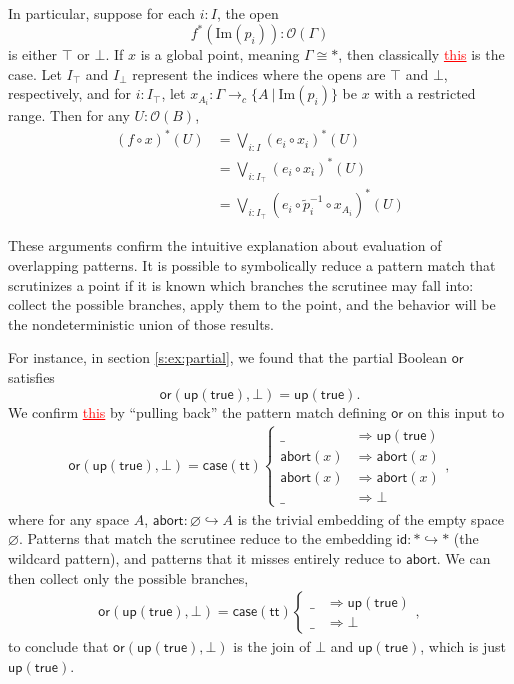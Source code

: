 \documentclass[conference]{IEEEtran}
\newcommand{\hookto}{\hookrightarrow}
\newcommand{\cto}{\to_c}
\newcommand{\suchthat}{\ |\ }
\newcommand{\Zero}{\varnothing}
\newcommand{\One}{\ast}
\newcommand{\Open}[1]{\mathcal{O}({#1})}
\newcommand{\wildcard}{\_}
\newcommand{\Img}[1]{\text{Im}\left({#1}\right)}
\newcommand{\Branch}{\Rightarrow}
\newcommand{\up}{\mathsf{up}}
\newcommand{\btrue}{\mathsf{true}}
\newcommand{\iimg}[1]{#1^*}
\newcommand{\grammar}[1]{\textcolor{red}{\underline{#1}}}
\begin{document}
In particular, suppose for each $i : I$, the open
\[
f^*(\Img{p_i}) : \Open{\Gamma}
\]
is either $\top$ or $\bot$. If $x$ is a global point, meaning $\Gamma \cong \One$, then classically \grammar{this} is the case. Let $I_\top$ and $I_\bot$ represent the indices where the opens are $\top$ and $\bot$, respectively, and for $i : I_\top$, let $x_{A_i} : \Gamma \cto \{ A \suchthat \Img{p_i} \}$ be $x$ with a restricted range. Then for any $U : \Open{B}$,
\begin{align*}
\iimg{(f \circ x)}(U) &= \bigvee_{i : I} \iimg{(e_i \circ x_i)}(U)
\\ &= \bigvee_{i : I_\top} \iimg{(e_i \circ x_i)}(U)
\\ &= \bigvee_{i : I_\top} \iimg{(e_i \circ \tilde{p}_i^{-1} \circ x_{A_i})}(U)
\end{align*}

These arguments confirm the intuitive explanation about evaluation of overlapping patterns. It is possible to symbolically reduce a pattern match that scrutinizes a point if it is known which branches the scrutinee may fall into: collect the possible branches, apply them to the point, and the behavior will be the nondeterministic union of those results.

For instance, in section \ref{s:ex:partial}, we found that the partial Boolean $\mathsf{or}$ satisfies
\[
\mathsf{or}(\mathsf{up}(\mathsf{true}), \bot) = \mathsf{up}(\mathsf{true}).
\]
We confirm \grammar{this} by ``pulling back'' the pattern match defining $\mathsf{or}$ on this input to
\begin{align*}
\mathsf{or}(\mathsf{up}(\mathsf{true}), \bot) = \mathsf{case}(\mathsf{tt})
\begin{cases}
\wildcard &\Branch \up(\btrue)
\\ \mathsf{abort}(x) &\Branch \mathsf{abort}(x)
\\ \mathsf{abort}(x) &\Branch \mathsf{abort}(x)
\\ \wildcard &\Branch \bot
\end{cases},
\end{align*}
where for any space $A$, $\mathsf{abort} : \Zero \hookto A$ is the trivial embedding of the empty space $\Zero$. Patterns that match the scrutinee reduce to the embedding $\mathsf{id} : \One \hookto \One$ (the wildcard pattern), and patterns that it misses entirely reduce to $\mathsf{abort}$. We can then collect only the possible branches,
\begin{align*}
\mathsf{or}(\mathsf{up}(\mathsf{true}), \bot) = \mathsf{case}(\mathsf{tt})
\begin{cases}
\wildcard &\Branch \up(\btrue)
\\ \wildcard &\Branch \bot
\end{cases},
\end{align*}
to conclude that $\mathsf{or}(\mathsf{up}(\mathsf{true}), \bot)$ is the join of $\bot$ and $\mathsf{up}(\mathsf{true})$, which is just $\mathsf{up}(\mathsf{true})$.
\end{document}
